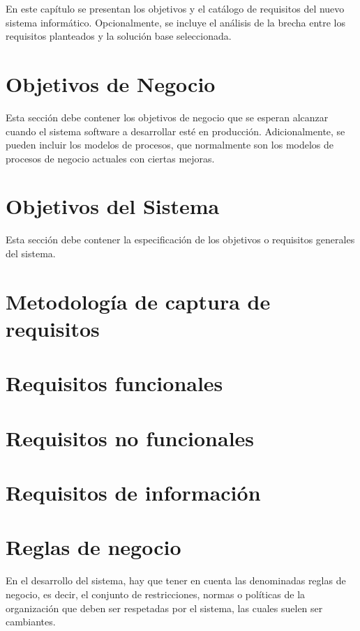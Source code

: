
En este capítulo se presentan los objetivos y el catálogo de requisitos del nuevo sistema informático. Opcionalmente, se incluye el análisis de la brecha entre los requisitos planteados y la solución base seleccionada. 

\section{Objetivos de Negocio}
Esta sección debe contener los objetivos de negocio que se esperan alcanzar cuando el sistema software a desarrollar esté en producción. Adicionalmente, se pueden incluir los modelos de procesos, que normalmente son los modelos de procesos de negocio actuales con ciertas mejoras.

\section{Objetivos del Sistema}
Esta sección debe contener la especificación de los objetivos o requisitos generales del sistema.

\section{Metodología de captura de requisitos}
\label{sec:RequirementsCaptureMethodology}


\section{Requisitos funcionales}
\label{sec:FunctionalRequirements}


\section{Requisitos no funcionales}
\label{sec:NonFunctionalRequirements}


\section{Requisitos de información}
\label{sec:InformationRequirements}


\section{Reglas de negocio}
En el desarrollo del sistema, hay que tener en cuenta las denominadas reglas de negocio, es decir, el conjunto de restricciones, normas o políticas de la organización que deben ser respetadas por el sistema, las cuales suelen ser cambiantes.


